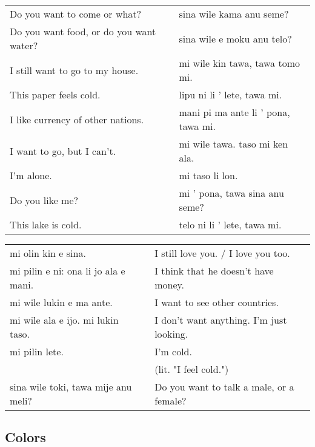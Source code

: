 \begin{supertabular}{p{5,5cm}|ll}
    Do you want to come or what?            &  & sina wile kama anu seme?            \\
    Do you want food, or do you want water? &  & sina wile e moku anu telo?          \\
    I still want to go to my house.         &  & mi wile kin tawa, tawa tomo mi.     \\
    This paper feels cold.                  &  & lipu ni li ' lete, tawa mi.         \\
    I like currency of other nations.       &  & mani pi ma ante li ' pona, tawa mi. \\
    I want to go, but I can't.              &  & mi wile tawa. taso mi ken ala.      \\
    I'm alone.                              &  & mi taso li lon.                     \\
    Do you like me?                         &  & mi ' pona, tawa sina anu seme?      \\
    This lake is cold.                      &  & telo ni li ' lete, tawa mi.         \\
\end{supertabular}

\begin{supertabular}{p{5,5cm}|ll}
    mi olin kin e sina.                  &  & I still love you. / I love you too.      \\
    mi pilin e ni: ona li jo ala e mani. &  & I think that he doesn't have money.      \\
    mi wile lukin e ma ante.             &  & I want to see other countries.           \\
    mi wile ala e ijo. mi lukin taso.    &  & I don't want anything. I'm just looking. \\
    mi pilin lete.                       &  & I'm cold.                                \\
                                         &  & (lit. "I feel cold.")                    \\
    sina wile toki, tawa mije anu meli?  &  & Do you want to talk a male, or a female? \\
\end{supertabular}

\newpage

\subsection*{Colors}
\label{'colors'}


